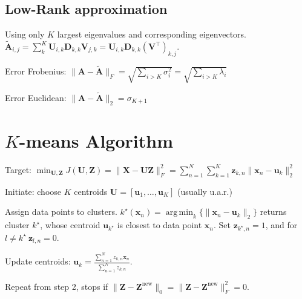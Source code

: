\documentclass[a4paper, 11pt, landscape]{article}
\DeclareMathOperator*{\argmin}{arg\,min}
\begin{document}
\begin{multicols*}{3}
\subsection{Low-Rank approximation}
Using only $K$ largest eigenvalues and corresponding eigenvectors. $\tilde{\mathbf{A}}_{i, j} = \sum_{k}^K \mathbf{U}_{i, k} \mathbf{D}_{k,k} \mathbf{V}_{j, k} = \mathbf{U}_{i, k} \mathbf{D}_{k,k} (\mathbf{V}^\top)_{k, j}$.
\begin{compactdesc}
	\item[Error Frobenius:] $\|\mathbf{A} - \tilde{\mathbf{A}}\|_F = \sqrt{\sum_{i > K} \sigma_i^2} = \sqrt{\sum_{i > K} \lambda_i}$
	\item[Error Euclidean:] $\|\mathbf{A} - \tilde{\mathbf{A}}\|_2 = \sigma_{K+1}$
\end{compactdesc}

\section{$K$-means Algorithm}
\begin{inparadesc}
	\item[\color{red}Target:] $\min_{\mathbf{U}, \mathbf{Z}} J(\mathbf{U}, \mathbf{Z}) = \|\mathbf{X} - \mathbf{U} \mathbf{Z}\|_F^2 = \sum_{n=1}^N \sum_{k=1}^K \mathbf{z}_{k,n} \|\mathbf{x}_n - \mathbf{u}_k\|_2^2$
\end{inparadesc}
\begin{inparaenum}
	\item Initiate: choose $K$ centroids $\mathbf{U} = [\mathbf{u}_1, \ldots, \mathbf{u}_K]$ (usually u.a.r.)
	\item Assign data points to clusters. $k^\star(\mathbf{x}_n) = \argmin_k \{ \|\mathbf{x}_n - \mathbf{u}_k\|_2 \}$ returns cluster $k^\star$, whose centroid $\mathbf{u}_{k^\star}$ is closest to data point $\mathbf{x}_n$. Set $\mathbf{z}_{k^\star,n} = 1$, and for $ l \neq k^\star~ \mathbf{z}_{l,n}=0$.
	\item Update centroids: $\mathbf{u}_k = \frac{\sum_{n=1}^N z_{k,n} \mathbf{x}_n}{\sum_{n=1}^N z_{k,n}}$.
	\item Repeat from step 2, stops if $\|\mathbf{Z} - \mathbf{Z}^\text{new}\|_0 = \|\mathbf{Z} - \mathbf{Z}^\text{new}\|^2_F = 0$.
\end{inparaenum}


\end{multicols*}
\end{document}
